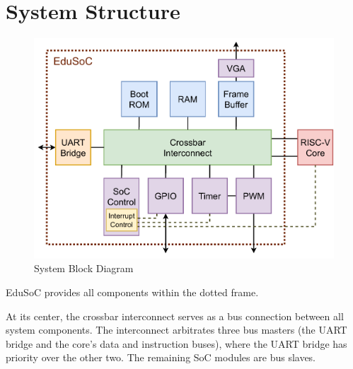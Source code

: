 \section{System Structure}\label{sec:structure}
\begin{figure}[H]
    \centering
    \includegraphics[width=\textwidth]{graphics/EduSoC Block Diagram.pdf}
    \vspace{-2em}
    \caption{System Block Diagram}
    \label{fig:block_diagram}
\end{figure}
EduSoC provides all components within the dotted frame. 

At its center, the crossbar interconnect serves as a bus connection between all system components.
The interconnect arbitrates three bus masters (the UART bridge and the core's data and instruction buses), where the UART bridge has priority over the other two.
The remaining SoC modules are bus slaves.

\newpage
